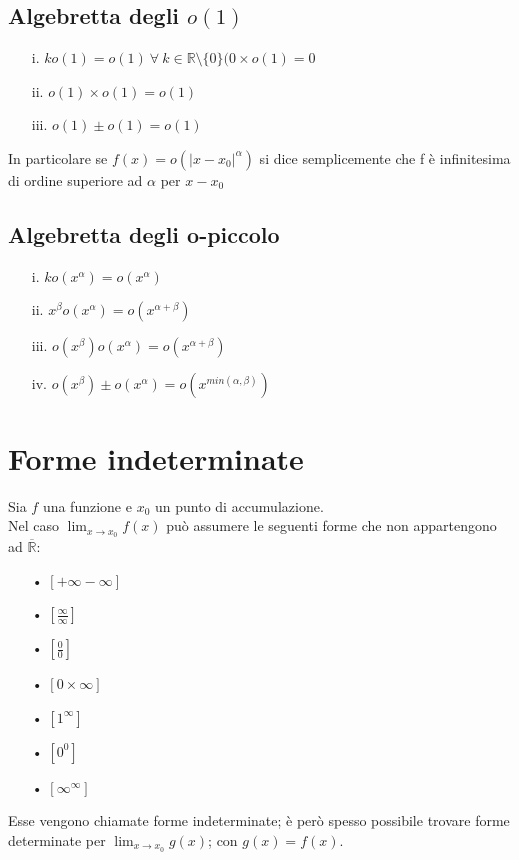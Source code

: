 \subsection{Algebretta degli $o(1)$}
\begin{enumerate}
\item[i.] $ko(1) = o(1)\ \forall\ k \in \mathbb{R} \setminus \{0\}  (0 \times o(1) = 0$
\item[ii.] $o(1)\times o(1) = o(1)$
\item[iii.] $o(1) \pm o(1) = o(1)$ 
\end{enumerate} 
In particolare se $f(x) = o(|x-x_0|^{\alpha})$ si dice semplicemente che f è infinitesima di ordine superiore ad $\alpha$  per $x-x_0$
\subsection{Algebretta degli o-piccolo}
\begin{enumerate}
\item[i.] $ko(x^{\alpha}) = o(x^{\alpha})$
\item[ii.] $x^{\beta}o(x^{\alpha}) = o(x^{\alpha + \beta})$
\item[iii.] $o(x^{\beta})o(x^{\alpha}) = o(x^{\alpha + \beta})$
\item[iv.] $o(x^{\beta}) \pm o(x^{\alpha}) = o(x^{min(\alpha ,\beta)})$
\end{enumerate}

\section{Forme indeterminate}
Sia $f$ una funzione e $x_0$ un punto di accumulazione.\\
Nel caso $\displaystyle \lim_{x \to x_0}f(x)$ può assumere le seguenti forme che non appartengono ad $\overline{\mathbb{R}}$:
\begin{enumerate}
\item[•] $[+\infty - \infty]$
\item[•] $[\frac{\infty}{\infty}]$
\item[•] $[\frac{0}{0}]$
\item[•] $[0 \times \infty]$
\item[•] $[1^{\infty}]$
\item[•] $[0^{0}]$
\item[•] $[\infty^{\infty}]$
\end{enumerate}
Esse vengono chiamate forme indeterminate; è però spesso possibile trovare forme determinate per $\displaystyle \lim_{x \to x_0}g(x)$; con $g(x) = f(x)$. 


